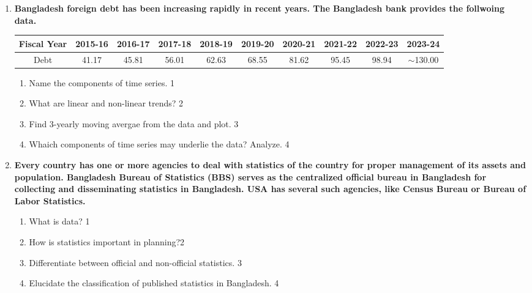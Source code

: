 \documentclass{article}
\begin{document}
\begin{enumerate}
       \item
	  \textbf{Bangladesh foreign debt has been increasing rapidly in recent years. The Bangladesh bank provides the follwoing data.}
	  
	  \begin{table}[h]
	  \centering
\begin{tabular}{c|c|c|c|c|c|c|c|c|c}
Fiscal Year & 2015-16 & 2016-17 & 2017-18 & 2018-19 & 2019-20 & 2020-21 & 2021-22 & 2022-23 & 2023-24 \\ \hline
Debt & 41.17 & 45.81 & 56.01 & 62.63 & 68.55 & 81.62 & 95.45 & 98.94 & $\sim$130.00
\end{tabular}
\end{table}
  
  \begin{enumerate}
    \item
	Name the components of time series. \hfill 1
    \item
	What are linear and non-linear trends? \hfill 2
    \item  
	Find 3-yearly moving avergae from the data and plot. \hfill 3
    \item
	Whaich components of time series may underlie the data? Analyze. \hfill 4
  \end{enumerate}
  
  
  
     \item
	  \textbf{Every country has one or more agencies to deal with statistics of the country for proper management of its assets and population. Bangladesh Bureau of Statistics (BBS) serves as the centralized official bureau in Bangladesh for collecting and disseminating statistics in Bangladesh. USA has several such agencies, like Census Bureau or Bureau of Labor Statistics.} 
  
  \begin{enumerate}
    \item
	What is data? \hfill 1
    \item
	How is statistics important in planning?\hfill 2
    \item  
	Differentiate between official and non-official statistics. \hfill 3
    \item
	Elucidate the classification of published statistics in Bangladesh.  \hfill 4
  \end{enumerate}

\end{enumerate}

 \vspace{2.5cm}

\begin{center}

\end{center}
\end{document}
